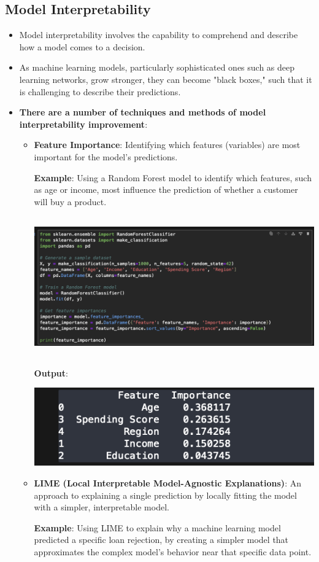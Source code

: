 \documentclass{article}
\begin{document}
\subsection{Model Interpretability}
\begin{itemize}
\item Model interpretability involves the capability to comprehend and describe how a model comes to a decision.
\item As machine learning models, particularly sophisticated ones such as deep learning networks, grow stronger, they can become "black boxes," such that it is challenging to describe their predictions.
\item \textbf{There are a number of techniques and methods of model interpretability improvement}: 
\begin{itemize}
\item \textbf{Feature Importance}: Identifying which features (variables) are most important for the model’s predictions.

\textbf{Example}: Using a Random Forest model to identify which features, such as age or income, most influence the prediction of whether a customer will buy a product.

\includegraphics[width=14cm,height=6cm]{Feature.png}

\textbf{Output}:

\includegraphics[width=14cm,height=2
cm]{Feature_Output.png}
\newpage
\item \textbf{LIME (Local Interpretable Model-Agnostic Explanations)}: An approach to explaining a single prediction by locally fitting the model with a simpler, interpretable model.

\textbf{Example}: Using LIME to explain why a machine learning model predicted a specific loan rejection, by creating a simpler model that approximates the complex model’s behavior near that specific data point.


\end{itemize}
\end{itemize}
\end{document}
